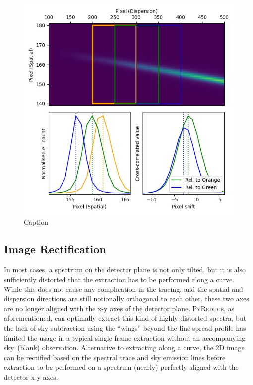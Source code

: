 \documentclass[fleqn,usenatbib]{mnras}
\begin{document}
\begin{figure}
    \centering
    \includegraphics[width=\columnwidth]{fig_01_tracing.jpg}
    \caption{Caption}
    \label{fig:trace}
\end{figure}


\subsection{Image Rectification}
In most cases, a spectrum on the detector plane is not only tilted,
but it is also sufficiently distorted that the extraction
has to be performed along a curve. While this does not cause any
complication in the tracing, and the spatial and dispersion
directions are still notionally orthogonal to each other, these two
axes are no longer aligned with the x-y axes of the detector plane.
\textsc{PyReduce}, as aforementioned, can optimally extract this
kind of highly distorted spectra, but the lack of sky subtraction
using the ``wings'' beyond the line-spread-profile has limited the
usage in a typical single-frame extraction without an accompanying
sky~(blank) observation. Alternative to extracting along a curve,
the 2D image can be rectified based on the spectral trace and sky
emission lines before extraction to be performed on a spectrum
(nearly) perfectly aligned with the detector x-y axes.
\end{document}
